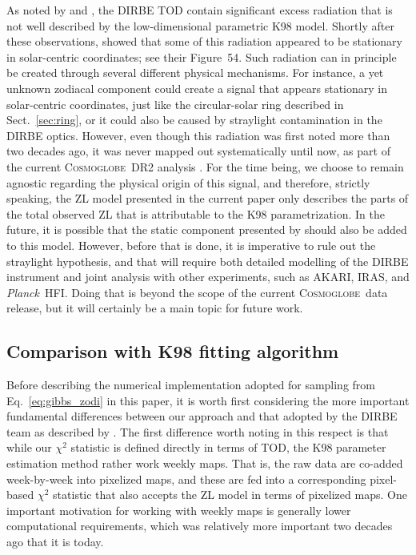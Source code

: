 \documentclass[twocolumn]{aa}
\def\Planck{\textit{Planck}}
\newcommand{\cosmoglobe}{\textsc{Cosmoglobe}}
\begin{document}
As noted by \citet{hauser1998} and \citet{Kelsall1998}, the DIRBE TOD
contain significant excess radiation that is not well described by the
low-dimensional parametric K98 model. Shortly after these
observations, \citet{leinert:1998} showed that some of this radiation
appeared to be stationary in solar-centric coordinates; see their
Figure~54. Such radiation can in principle be created through several
different physical mechanisms. For instance, a yet unknown zodiacal
component could create a signal that appears stationary in
solar-centric coordinates, just like the circular-solar ring described
in Sect.~\ref{sec:ring}, or it could also be caused by straylight
contamination in the DIRBE optics. However, even though this radiation
was first noted more than two decades ago, it was never mapped out
systematically until now, as part of the current \cosmoglobe\ DR2
analysis \citep{CG02_01}. For the time being, we choose to remain
agnostic regarding the physical origin of this signal, and therefore,
strictly speaking, the ZL model presented in the current paper only
describes the parts of the total observed ZL that is attributable to
the K98 parametrization. In the future, it is possible that the static
component presented by \citet{CG02_01} should also be added to this
model. However, before that is done, it is imperative to rule out the
straylight hypothesis, and that will require both detailed modelling
of the DIRBE instrument and joint analysis with other experiments,
such as AKARI, IRAS, and \Planck\ HFI. Doing that is beyond the scope
of the current \cosmoglobe\ data release, but it will certainly be a
main topic for future work.


\subsection{Comparison with K98 fitting algorithm}
\label{sec:algorithm_comparison}

Before describing the numerical implementation adopted for sampling
from Eq.~\eqref{eq:gibbs_zodi} in this paper, it is worth first
considering the more important fundamental differences between our
approach and that adopted by the DIRBE team as described by
\citet{Kelsall1998}. The first difference worth noting in this respect
is that while our $\chi^2$ statistic is defined directly in terms of
TOD, the K98 parameter estimation method rather work weekly maps. That
is, the raw data are co-added week-by-week into pixelized maps, and
these are fed into a corresponding pixel-based $\chi^2$ statistic that
also accepts the ZL model in terms of pixelized maps. One important
motivation for working with weekly maps is generally lower
computational requirements, which was relatively more important two
decades ago that it is today.
\end{document}
